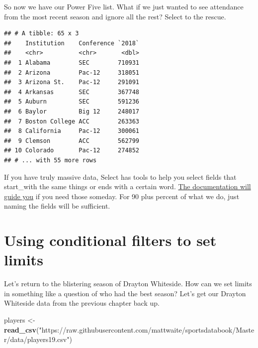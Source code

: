 \documentclass[]{book}
\newenvironment{Shaded}{\begin{snugshade}}{\end{snugshade}}
\newcommand{\KeywordTok}[1]{\textcolor[rgb]{0.13,0.29,0.53}{\textbf{#1}}}
\newcommand{\DataTypeTok}[1]{\textcolor[rgb]{0.13,0.29,0.53}{#1}}
\newcommand{\StringTok}[1]{\textcolor[rgb]{0.31,0.60,0.02}{#1}}
\newcommand{\OperatorTok}[1]{\textcolor[rgb]{0.81,0.36,0.00}{\textbf{#1}}}
\newcommand{\NormalTok}[1]{#1}
\begin{document}
So now we have our Power Five list. What if we just wanted to see
attendance from the most recent season and ignore all the rest? Select
to the rescue.

\begin{Shaded}
\end{Shaded}

\begin{verbatim}
## # A tibble: 65 x 3
##    Institution    Conference `2018`
##    <chr>          <chr>       <dbl>
##  1 Alabama        SEC        710931
##  2 Arizona        Pac-12     318051
##  3 Arizona St.    Pac-12     291091
##  4 Arkansas       SEC        367748
##  5 Auburn         SEC        591236
##  6 Baylor         Big 12     248017
##  7 Boston College ACC        263363
##  8 California     Pac-12     300061
##  9 Clemson        ACC        562799
## 10 Colorado       Pac-12     274852
## # ... with 55 more rows
\end{verbatim}

If you have truly massive data, Select has tools to help you select
fields that start\_with the same things or ends with a certain word.
\href{https://dplyr.tidyverse.org/reference/select.html}{The
documentation will guide you} if you need those someday. For 90 plus
percent of what we do, just naming the fields will be sufficient.

\section{Using conditional filters to set
limits}\label{using-conditional-filters-to-set-limits}

Let's return to the blistering season of Drayton Whiteside. How can we
set limits in something like a question of who had the best season?
Let's get our Drayton Whiteside data from the previous chapter back up.

\begin{Shaded}
\begin{Highlighting}[]
\NormalTok{players <-}\StringTok{ }\KeywordTok{read_csv}\NormalTok{(}\StringTok{"https://raw.githubusercontent.com/mattwaite/sportsdatabook/Master/data/players19.csv"}\NormalTok{)}
\end{Highlighting}
\end{Shaded}
\end{document}
